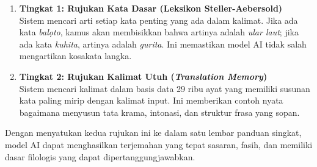 \begin{enumerate}
    \item \textbf{Tingkat 1: Rujukan Kata Dasar (Leksikon Steller-Aebersold)} \\
    Sistem mencari arti setiap kata penting yang ada dalam kalimat. Jika ada kata \textit{bal\d{o}to}, kamus akan membisikkan bahwa artinya adalah \textit{ular laut}; jika ada kata \textit{kuhita}, artinya adalah \textit{gurita}. Ini memastikan model AI tidak salah mengartikan kosakata langka.
    \item \textbf{Tingkat 2: Rujukan Kalimat Utuh (\textit{Translation Memory})} \\
    Sistem mencari kalimat dalam basis data 29 ribu ayat yang memiliki susunan kata paling mirip dengan kalimat input. Ini memberikan contoh nyata bagaimana menyusun tata krama, intonasi, dan struktur frasa yang sopan.
\end{enumerate}

Dengan menyatukan kedua rujukan ini ke dalam satu lembar panduan singkat, model AI \texttt{\StatBaseModel} dapat menghasilkan terjemahan yang tepat sasaran, fasih, dan memiliki dasar filologis yang dapat dipertanggungjawabkan.
